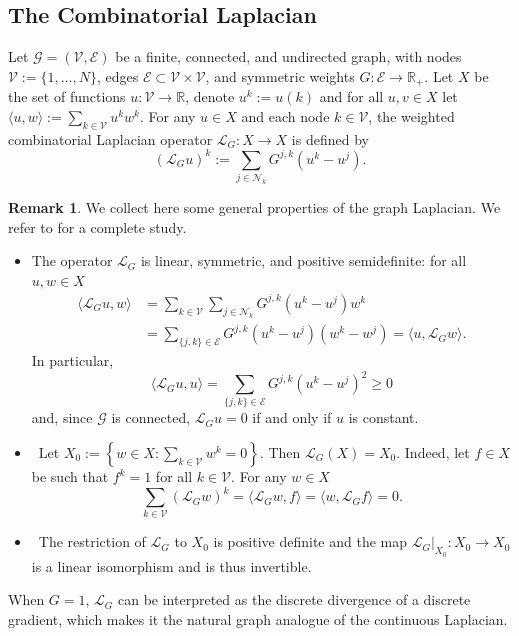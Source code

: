 \documentclass[a4paper,11pt]{article}
\theoremstyle{definition}
\newtheorem{remark}[theorem]{Remark}
\numberwithin{equation}{section}
\newcommand{\R}{\mathbb{R}}
\newcommand{\V}{\mathcal{V}}
\begin{document}
\subsection{The Combinatorial Laplacian}
Let $\mathcal{G}=(\V,\mathcal{E})$ be a finite, connected, and undirected graph, with nodes $\V := \{1, \dots, N\}$, edges $\mathcal{E} \subset \V \times \V$, and symmetric weights $G : \mathcal{E}\to\R_+$. Let $X$ be the set of functions $u:\V \to \R$,  denote $u^k:=u(k)$ and for all $u,v\in X$ let $\langle u, w \rangle:=\sum_{k\in \V}u^kw^k$. For any \( u \in X \) and each node $ k \in \V$, the weighted combinatorial Laplacian operator \( \mathcal{L}_G: X \to X \) is defined by
\[
(\mathcal{L}_G u)^k  := \sum_{j \in \mathcal{N}_k} G^{j,k} (u^k - u^j).
\]
\noindent
\begin{remark}
	\label{rem:laplacian}
	We collect here some general properties of the graph Laplacian. We refer to \cite{CH97} for a complete study. 
	
	\begin{itemize}
		\item[(i)] The operator \(\mathcal{L}_G\) is linear, symmetric, and positive semidefinite: for all $u,w \in X$
		\begin{align}
			\langle \mathcal{L}_G u, w \rangle &= \sum_{k \in \V} \sum_{j \in \mathcal{N}_k} G^{j,k} (u^k - u^j) w^k   \\
			&=  \sum_{\{j,k\}\in \mathcal{E}} G^{j,k} (u^k - u^j) (w^k - w^j) =\langle u, \mathcal{L}_G w \rangle.\label{5}
		\end{align}
		In particular,
		\[
		\langle \mathcal{L}_G u, u \rangle 	=  \sum_{\{j,k\}\in \mathcal{E}} G^{j,k} (u^k - u^j)^2 \geq 0
		\] 
		and, since $\mathcal{G}$ is connected, $\mathcal L_Gu =0$ if and only if $u$ is constant. 
		\item[(ii)] \, Let $X_0:=\left\{ w\in X : \sum_{k \in \V}w^k=0\right\}$. Then $\mathcal{L}_G(X)=X_0$. Indeed, let $f \in X$ be such that  $f^k=1$ for all $k\in \V$. For any \(w \in X\)
		\[
		\sum_{k \in \V} (\mathcal{L}_G w)^k = \langle \mathcal{L}_G w, f \rangle =  \langle w, \mathcal{L}_G  f \rangle =0.
		\]
		\item[(iii)] \, The restriction of $\mathcal L_G$ to $X_0$ is positive definite and the map $\mathcal{L}_G|_{X_0} : X_0 \to X_0$ is a linear isomorphism and is thus invertible. 
	\end{itemize}	
	When $G=1$,  $\mathcal L_G$ can be interpreted as the discrete divergence of a discrete gradient, which makes it the natural graph analogue of the continuous Laplacian.
\end{remark}
\end{document}
